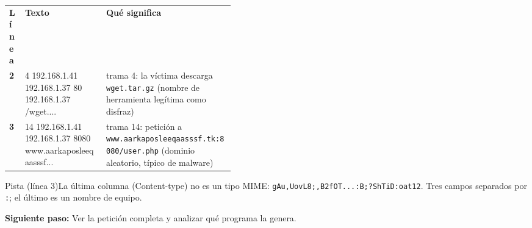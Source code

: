 \documentclass[11pt,a4paper]{article}
\begin{document}
\begin{tcolorbox}[enhanced, breakable, colback=white, colframe=blue!40, boxrule=0.3pt, arc=1pt, left=4pt, right=4pt, top=2pt, bottom=2pt, fonttitle=\sffamily\scriptsize\bfseries, coltitle=black!75, colbacktitle=blue!8, title={Análisis de la salida}, attach title to upper, before skip=2pt, after skip=4pt, fontupper=\small]
\par{\renewcommand{\arraystretch}{1.12}\begin{tabularx}{\linewidth}{@{}>{\raggedright\arraybackslash}p{0.07\linewidth}>{\raggedright\arraybackslash}p{0.36\linewidth}>{\raggedright\arraybackslash}X@{}}
\textbf{Línea} & \textbf{Texto} & \textbf{Qué significa} \\
\textbf{2} & {\ttfamily\scriptsize 4       192.\allowbreak{}168.1.41    \allowbreak{}192.168.1.37\allowbreak{}    80      \allowbreak{}192.168.1.37\allowbreak{}    /wget...\allowbreak{}.} & trama 4: la víctima descarga \texttt{wget.tar.gz} (nombre de herramienta legítima como disfraz) \\
\textbf{3} & {\ttfamily\scriptsize 14      192.\allowbreak{}168.1.41    \allowbreak{}192.168.1.37\allowbreak{}    8080    \allowbreak{}www.aarkapos\allowbreak{}leeqaasssf..\allowbreak{}.} & trama 14: petición a \texttt{www.aarkaposleeqaasssf.tk:8080/user.php} (dominio aleatorio, típico de malware) \\
\end{tabularx}}
\end{tcolorbox}
\begin{pista}{Pista (línea 3)}La última columna (Content-type) no es un tipo MIME: \texttt{gAu,UovL8;,B2fOT...:B;?ShTiD:oat12}. Tres campos separados por \texttt{:}; el último es un nombre de equipo.\par\smallskip\textbf{Siguiente paso:} Ver la petición completa y analizar qué programa la genera.\end{pista}
\end{document}
